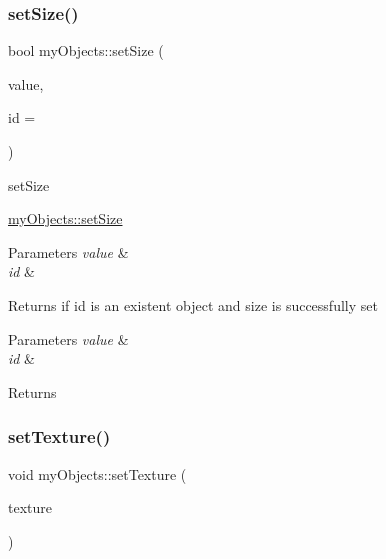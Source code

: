 \subsubsection{\texorpdfstring{set\+Size()}{setSize()}}
{\footnotesize\ttfamily bool my\+Objects\+::set\+Size (\begin{DoxyParamCaption}\item[{float}]{value,  }\item[{uint}]{id = {} }\end{DoxyParamCaption})}



set\+Size 

\hyperlink{classmyObjects_ad58306f67d79a54ac844e194b08704c6}{my\+Objects\+::set\+Size}


\begin{DoxyParams}{Parameters}
{\em value} & \\
\hline
{\em id} & \\
\hline
\end{DoxyParams}
\begin{DoxyReturn}{Returns}
if id is an existent object and size is successfully set
\end{DoxyReturn}

\begin{DoxyParams}{Parameters}
{\em value} & \\
\hline
{\em id} & \\
\hline
\end{DoxyParams}
\begin{DoxyReturn}{Returns}

\end{DoxyReturn}
\mbox{\label{classmyObjects_a51cd02184d2634fabeee1f0845f5ad21}} 
\subsubsection{\texorpdfstring{set\+Texture()}{setTexture()}\hspace{0.1cm}{\footnotesize\ttfamily [1/2]}}
{\footnotesize\ttfamily void my\+Objects\+::set\+Texture (\begin{DoxyParamCaption}\item[{Q\+Open\+G\+L\+Texture \&}]{texture }\end{DoxyParamCaption})\hspace{0.3cm}{\ttfamily [virtual]}}



